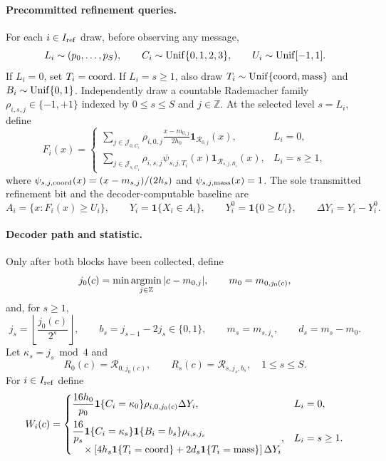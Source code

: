\paragraph{Precommitted refinement queries.}
For each $i\in I_{\rm ref}$ draw, before observing any message,
\[
L_i\sim(p_0,\ldots,p_S),\qquad
C_i\sim{\rm Unif}\{0,1,2,3\},\qquad
U_i\sim{\rm Unif}[-1,1].
\]
If $L_i=0$, set $T_i={\rm coord}$.  If $L_i=s\geq1$, also draw
$T_i\sim{\rm Unif}\{{\rm coord},{\rm mass}\}$ and
$B_i\sim{\rm Unif}\{0,1\}$.  Independently draw a countable Rademacher
family $\rho_{i,s,j}\in\{-1,+1\}$ indexed by $0\leq s\leq S$ and
$j\in\mathbb Z$.  At the selected level $s=L_i$, define
\[
F_i(x)=
\begin{cases}
\displaystyle
\sum_{j\in\mathcal J_{0,C_i}}\rho_{i,0,j}
  \frac{x-m_{0,j}}{2h_0}\mathbf 1_{\mathcal R_{0,j}}(x),&L_i=0,\\[1em]
\displaystyle
\sum_{j\in\mathcal J_{s,C_i}}\rho_{i,s,j}
  \psi_{s,j,T_i}(x)\mathbf 1_{\mathcal R_{s,j,B_i}}(x),&L_i=s\geq1,
\end{cases}
\]
where
$\psi_{s,j,{\rm coord}}(x)=(x-m_{s,j})/(2h_s)$ and
$\psi_{s,j,{\rm mass}}(x)=1$.  The sole transmitted refinement bit and
the decoder-computable baseline are
\[
A_i=\{x:F_i(x)\geq U_i\},\qquad
Y_i=\mathbf 1\{X_i\in A_i\},\qquad
Y_i^0=\mathbf 1\{0\geq U_i\},\qquad
\Delta Y_i=Y_i-Y_i^0.
\]

\paragraph{Decoder path and statistic.}
Only after both blocks have been collected, define
\[
j_0(c)=\min\mathop{\rm argmin}_{j\in\mathbb Z}|c-m_{0,j}|,\qquad
m_0=m_{0,j_0(c)},
\]
and, for $s\geq1$,
\[
j_s=\left\lfloor\frac{j_0(c)}{2^s}\right\rfloor,
\qquad b_s=j_{s-1}-2j_s\in\{0,1\},\qquad
m_s=m_{s,j_s},\qquad d_s=m_s-m_0.
\]
Let $\kappa_s=j_s\bmod4$ and
\[
R_0(c)=\mathcal R_{0,j_0(c)},\qquad
R_s(c)=\mathcal R_{s,j_s,b_s},\quad 1\leq s\leq S.
\]
For $i\in I_{\rm ref}$ define
\[
W_i(c)=
\begin{cases}
\displaystyle
\frac{16h_0}{p_0}\mathbf 1\{C_i=\kappa_0\}
 \rho_{i,0,j_0(c)}\Delta Y_i,&L_i=0,\\[1em]
\displaystyle
\begin{aligned}
&\frac{16}{p_s}\mathbf 1\{C_i=\kappa_s\}
 \mathbf 1\{B_i=b_s\}\rho_{i,s,j_s}\\[-0.2em]
&\quad{}\times\left[4h_s\mathbf 1\{T_i={\rm coord}\}
 +2d_s\mathbf 1\{T_i={\rm mass}\}\right]\Delta Y_i
\end{aligned},
 &L_i=s\geq1.
\end{cases}
\]

